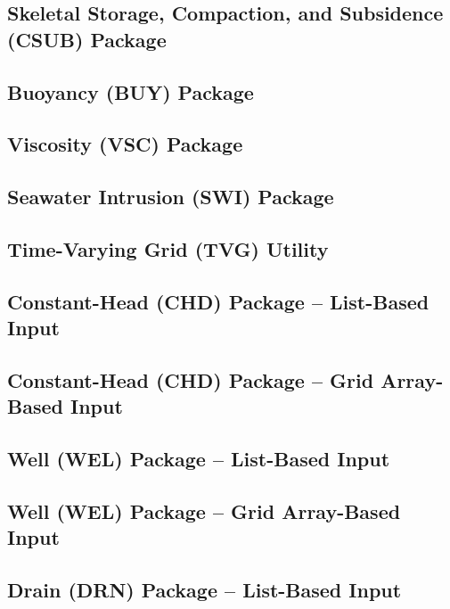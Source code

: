 \newpage
\subsection{Skeletal Storage, Compaction, and Subsidence (CSUB) Package}


\newpage
\subsection{Buoyancy (BUY) Package}


\newpage
\subsection{Viscosity (VSC) Package}


\newpage
\subsection{Seawater Intrusion (SWI) Package}


\newpage
\subsection{Time-Varying Grid (TVG) Utility}


\newpage
\subsection{Constant-Head (CHD) Package -- List-Based Input}


\newpage
\subsection{Constant-Head (CHD) Package -- Grid Array-Based Input}


\newpage
\subsection{Well (WEL) Package -- List-Based Input}


\newpage
\subsection{Well (WEL) Package -- Grid Array-Based Input}


\newpage
\subsection{Drain (DRN) Package -- List-Based Input}


